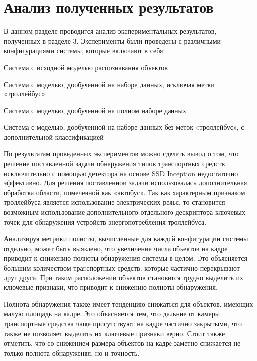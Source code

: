 \chapter{Анализ полученных результатов}

В данном разделе проводится анализ экспериментальных результатов, полученных в разделе 3. Эксперименты были проведены с различными конфигурациями системы, которые включают в себя:

%
\begin{itemize*}
  \item Система с исходной моделью распознавания объектов
  \item Система с моделью, дообученной на наборе данных, исключая метки «троллейбус»
  \item Система с моделью, дообученной на полном наборе данных	  
  \item Система с моделью, дообученной на наборе данных без меток «троллейбус», с дополнительной классификацией	
\end{itemize*}
%

По результатам проведенных экспериментов можно сделать вывод о том, что решение поставленной задачи обнаружения типов транспортных средств исключительно с помощью детектора на основе SSD Inception недостаточно эффективно. Для решения поставленной задачи использовалась дополнительная обработка области, помеченной как «автобус». Так как характерным признаком троллейбуса является использование электрических рельс, то становится возможным использование дополнительного отдельного дескриптора ключевых точек для обнаружения устройств энергопотребления троллейбуса. 

Анализируя метрики полноты, вычисленные для каждой конфигурации системы отдельно, может быть выявлено, что увеличение числа объектов на кадре приводит к снижению полноты обнаружения системы в целом. Это объясняется большим количеством транспортных средств, которые частично перекрывают друг друга. При таком расположении объектов становится трудно выделить их ключевые признаки, что приводит к снижению полноты обнаружения. 

Полнота обнаружения также имеет тенденцию снижаться для объектов, имеющих малую площадь на кадре. Это объясняется тем, что дальние от камеры транспортные средства чаще присутствуют на кадре частично закрытыми, что также не позволяет выделить их ключевые признаки верно. Стоит также отметить, что со снижением размера объектов на кадре заметно снижается не только полнота обнаружения, но и точность. 

